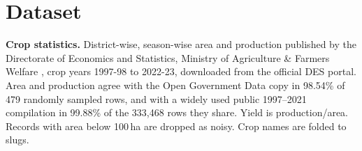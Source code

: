 \documentclass[conference]{IEEEtran}
\begin{document}
\begin{table}[t]
\caption{How recent crop-recommendation work evaluates (from full text where available).}
\label{tab:lit}
\centering\scriptsize
\setlength{\tabcolsep}{2.5pt}
\end{table}

\section{Dataset}

\textbf{Crop statistics.} District-wise, season-wise area and production published by the
Directorate of Economics and Statistics, Ministry of Agriculture \& Farmers Welfare
\cite{desapy,ogdindia}, crop years 1997-98 to 2022-23, downloaded from the official DES
portal. Area and production agree with the Open Government Data copy \cite{ogdindia} in
98.54\% of 479 randomly sampled rows, and with a widely used public 1997--2021 compilation
\cite{pyatakov2023} in 99.88\% of the 333,468 rows they share. Yield
is production/area. Records with area below 100\,ha are dropped
as noisy. Crop names are folded to \NCrops{} slugs.
\end{document}
